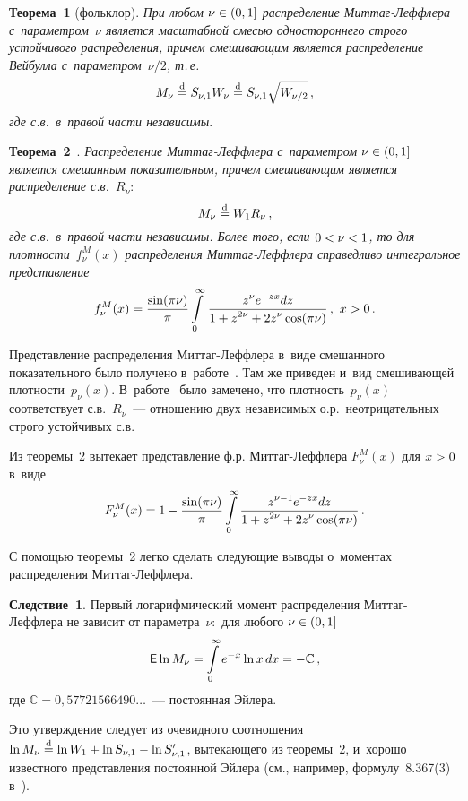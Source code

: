 \begin{multicols}{2}
\noindent
\textbf{Теорема~1} (фольклор). \textit{При любом $\nu\hm\in(0,1]$
распределение Миттаг-Леффлера с~параметром~$\nu$ является масштабной
смесью одностороннего строго устойчивого распределения, причем
смешивающим является распределение Вейбулла с~параметром~$\nu/2$, т.\,е.}
$$
M_{\nu}\stackrel{\mathrm{d}}{=} S_{\nu,1}W_{\nu}\stackrel{\mathrm{d}}{=} S_{\nu,1}\sqrt{W_{\nu/2}}\,,
$$
\textit{где с.в.\ в~правой части независимы}.

\smallskip

\noindent
\textbf{Теорема~2}~\cite{KorolevZeifman2017, Kozubowski1998}. \textit{Распределение 
Мит\-таг-Леф\-фле\-ра с~параметром $\nu\hm\in(0,1]$ является
смешанным показательным, причем смешивающим является распределение
с.в.~$R_{\nu}\!:$}
$$
M_{\nu}\stackrel{\mathrm{d}}{=} W_1 R_{\nu}\,,
$$
\textit{где с.в.\ в~правой части независимы. Более того, если
$0\hm<\nu\hm<1$, то для плотности~$f_{\nu}^{M}(x)$ распределения
Мит\-таг-Леф\-фле\-ра справедливо интегральное пред\-став\-ле\-ние}
$$
f_{\nu}^{M}(x)=\fr{\sin(\pi\nu)}{\pi}\int\limits_{0}^{\infty}\,
\fr{z^{\nu}e^{-zx}dz}{1+z^{2\nu}+2z^{\nu}\cos(\pi\nu)}\,,\ 
 x>0\,.
$$

\smallskip

Представление распределения Мит\-таг-Леф\-фле\-ра в~виде смешанного
показательного было получено в~работе~\cite{Kozubowski1998}. Там же
приведен и~вид сме\-ши\-ва\-ющей плотности~$p_{\nu}(x)$. В~работе~\cite{KorolevZeifman2017} 
было замечено, что плотность~$p_{\nu}(x)$
соответствует с.в.~$R_\nu$~--- отношению двух независимых о.р.\
неотрицательных строго устойчивых с.в.

Из теоремы~2 вытекает представление ф.р. Мит\-таг-Леф\-фле\-ра
$F_{\nu}^{M}(x)$ для $x\hm>0$ в~виде
$$
F_{\nu}^{M}(x)= 1-\displaystyle\frac{\displaystyle \sin(\pi\nu)\mathstrut}{\displaystyle \pi\mathstrut}\int\limits_{0}^{\infty}\displaystyle\frac{\displaystyle 
z^{\nu-1}e^{-zx}dz\mathstrut}{\displaystyle 1+z^{2\nu}+2z^{\nu}\cos(\pi\nu)\mathstrut}\,.
$$

\smallskip

С помощью теоремы~2 легко сделать следующие выводы о~моментах
распределения Мит\-таг-Леф\-флера.

\bigskip

\noindent
\textbf{Следствие~1}. Первый логарифмический момент распределения
Мит\-таг-Леф\-фле\-ра не зависит от параметра~$\nu\!:$ для любого
$\nu\hm\in(0,1]$
$$
{\sf E}\ln M_{\nu}=\int\limits_{0}^{\infty}e^{-x}\ln x\,dx=-\mathbb{C}\,,
$$
где $\mathbb{C}=0{,}57721566490\ldots$~--- постоянная Эйлера.

\smallskip

Это утверждение следует из очевидного со\-от\-ношения $\ln M_{\nu}\hm\eqd
\ln W_1\hm+\ln S_{\nu,1}\hm-\ln S'_{\nu,1}$, вы\-те\-ка\-ющего из теоремы~2, 
и~хорошо известного пред\-став\-ле\-ния постоянной Эйлера (см., например,\linebreak
формулу~8.367(3) в~\cite{GradsteinRyzhik1971}).


\end{multicols}
